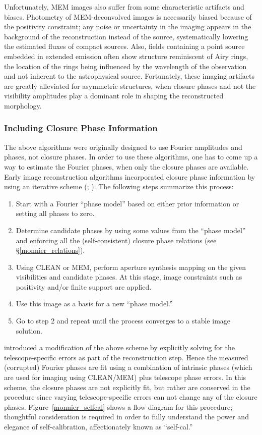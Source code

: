 \documentclass[12pt]{article}
\begin{document}
Unfortunately, MEM images also suffer from some characteristic artifacts
and biases.  Photometry of MEM-deconvolved images is necessarily biased
because of the positivity constraint; any noise or uncertainty in the
imaging appears in the background of the reconstruction instead of
the source, systematically lowering the estimated fluxes of compact sources.
Also, fields containing a point source embedded in extended emission
often show structure reminiscent of Airy rings, the location of the
rings being influenced by the wavelength of the observation and not inherent
to the astrophysical source.  Fortunately, these imaging artifacts 
are greatly
alleviated for asymmetric structures, when closure phases and not
the visibility amplitudes play a dominant role in shaping the
reconstructed morphology.



\subsubsection{Including Closure Phase Information}

The above algorithms were originally 
designed to use Fourier amplitudes and
phases, not closure phases.  In order to use these algorithms,
one has to come up a way to estimate the Fourier phases, when only
the closure phases are available.
Early image reconstruction algorithms
incorporated closure phase information by using an iterative scheme
(\citealt{thompson86}; \citealt{rw78}).  
The following steps summarize
this process:
\begin{enumerate}
\item{Start with a Fourier ``phase model'' based on either prior
    information or setting all phases to zero.}
\item{Determine candidate phases by using some values from the ``phase
    model'' and enforcing all the (self-consistent) closure phase
    relations (see \S\ref{monnier_relations}).}
\item{Using CLEAN or MEM, perform aperture synthesis mapping on the
    given visibilities and candidate phases.  At this stage, image
    constraints such as positivity and/or finite support are applied.}
\item{Use this image as a basis for a new ``phase model.''}
\item{Go to step 2 and repeat until the process converges to a stable
    image solution.} \end{enumerate}

\cite{cw81} introduced a modification of the above scheme by
explicitly solving for the telescope-specific errors as part of the
reconstruction step.  Hence the measured (corrupted) Fourier phases
are fit using a combination of intrinsic phases (which are used for
imaging using CLEAN/MEM) plus telescope phase errors.  In this scheme,
the closure phases are not explicitly fit, but rather are conserved in
the procedure since varying telescope-specific errors can not change
any of the closure phases.  Figure~\ref{monnier_selfcal} shows a flow
diagram for this procedure; thoughtful consideration is required in
order to fully understand the power and elegance of self-calibration,
affectionately known as  ``self-cal.''
\end{document}
